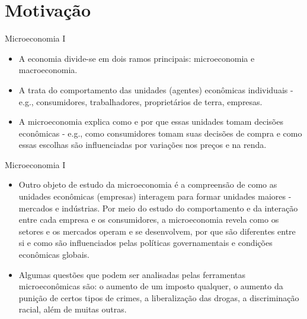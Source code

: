 \documentclass[10pt]{beamer}
\begin{document}
\section{Motivação}
\begin{frame}{Microeconomia I}
    \begin{itemize}
        \item A economia divide-se em dois ramos principais: microeconomia e macroeconomia. \bigskip

        \item A  trata do comportamento das unidades (agentes) econômicas individuais - e.g., consumidores, trabalhadores, proprietários de terra, empresas. \bigskip

        \item A microeconomia explica como e por que essas unidades tomam decisões econômicas - e.g., como consumidores tomam suas decisões de compra e como essas escolhas são influenciadas por variações nos preços e na renda.
    \end{itemize}
\end{frame}

\begin{frame}{Microeconomia I}
    \begin{itemize}
        \item Outro objeto de estudo da microeconomia é a compreensão de como as unidades econômicas (empresas) interagem para formar unidades maiores - mercados e indústrias. Por meio do estudo do comportamento e da interação entre cada empresa e os consumidores, a microeconomia revela como os setores e os mercados operam e se desenvolvem, por que são diferentes entre si e como são influenciados pelas políticas governamentais e condições econômicas globais.\bigskip

        \item Algumas questões que podem ser analisadas pelas ferramentas microeconômicas são: o aumento de um imposto qualquer, o aumento da punição de certos tipos de crimes, a liberalização das drogas, a discriminação racial, além de muitas outras.
    \end{itemize}
\end{frame}
\end{document}
